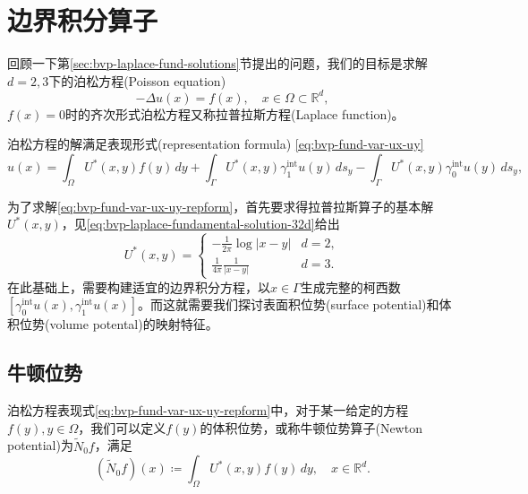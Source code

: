 \section{边界积分算子}
\label{sec:bvp-integral-operators}

回顾一下第\ref{sec:bvp-laplace-fund-solutions}节提出的问题，我们的目标是求解$d=2,3$下的泊松方程(Poisson equation)
\begin{equation*}
  -\Delta u(x) = f(x), \quad x \in \Omega \subset \mathbb{R}^d,
\end{equation*}
$f(x)=0$时的齐次形式泊松方程又称拉普拉斯方程(Laplace function)。

泊松方程的解满足表现形式(representation formula)   \eqref{eq:bvp-fund-var-ux-uy}
\begin{equation}
  \label{eq:bvp-fund-var-ux-uy-repform}
  u(x) = \int_{\Omega} U^{*}(x,y) f(y) \, dy
  + \int_{\Gamma} U^{*}(x,y) \gamma_{1}^{\text{int}} u(y) \, d s_y
  - \int_{\Gamma} U^{*}(x,y) \gamma_{0}^{\text{int}} u(y) \, d s_y,
\end{equation}

为了求解\eqref{eq:bvp-fund-var-ux-uy-repform}，首先要求得拉普拉斯算子的基本解$U^{*}(x,y)$，见\eqref{eq:bvp-laplace-fundamental-solution-32d}给出
\begin{equation*}
  U^{*}(x,y) = \begin{cases}
  - \frac{1}{2 \pi} \log | x - y | & d =2, \\
  \frac{1}{4 \pi} \frac{1}{| x - y |} & d = 3.
  \end{cases}
\end{equation*}
在此基础上，需要构建适宜的边界积分方程，以$x \in \Gamma$生成完整的柯西数$\left[ \gamma_{0}^{\text{int}} u(x),  \gamma_{1}^{\text{int}} u(x)\right]$。而这就需要我们探讨表面积位势(surface potential)和体积位势(volume potental)的映射特征。

\subsection{牛顿位势}
\label{sec:bvp-newton-potential}
泊松方程表现式\eqref{eq:bvp-fund-var-ux-uy-repform}中，对于某一给定的方程$f(y), y \in \Omega$，我们可以定义$f(y)$的体积位势，或称牛顿位势算子(Newton potential)为$\widetilde{N}_{0} f $，满足
\begin{equation}
  \label{eq:bvp-newton-potential-def}
  \left( \widetilde{N}_{0} f \right) (x) \coloneqq \int_{\Omega} U^{*}(x,y) f(y) \, dy, \quad x \in \mathbb{R}^{d}.
\end{equation}

